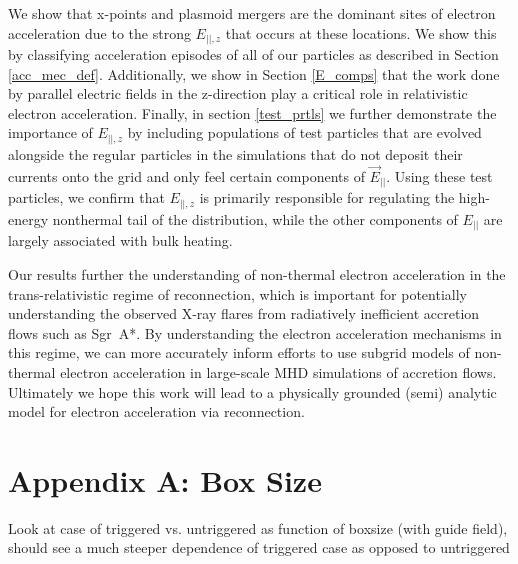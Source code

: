 \documentclass[iop,twocolappendix]{emulateapj}
\begin{document}
We show that x-points and plasmoid mergers are the dominant sites of electron acceleration due to the strong $E_{||,z}$ that occurs at these locations.  We show this by classifying acceleration episodes of all of our particles as described in Section \ref{acc_mec_def}.  Additionally, we show in Section \ref{E_comps} that the work done by parallel electric fields in the z-direction play a critical role in relativistic electron acceleration.  Finally, in section \ref{test_prtls} we further demonstrate the importance of $E_{||,z}$ by including populations of test particles that are evolved alongside the regular particles in the simulations that do not deposit their currents onto the grid and only feel certain components of $\vec{E}_{||}$.  Using these test particles, we confirm that $E_{||,z}$ is primarily responsible for regulating the high-energy nonthermal tail of the distribution, while the other components of $E_{||}$ are largely associated with bulk heating.

Our results further the understanding of non-thermal electron acceleration in the trans-relativistic regime of reconnection, which is important for potentially understanding the observed X-ray flares from radiatively inefficient accretion flows such as Sgr~A*.   By understanding the electron acceleration mechanisms in this regime, we can more accurately inform efforts to use subgrid models of non-thermal electron acceleration in large-scale MHD simulations of accretion flows.  Ultimately we hope this work will lead to a physically grounded (semi) analytic model for electron acceleration via reconnection.


\section{Appendix A: Box Size}\label{box_size}
Look at case of triggered vs. untriggered as function of boxsize (with guide field), should see a much steeper dependence of triggered case as opposed to untriggered
\end{document}
